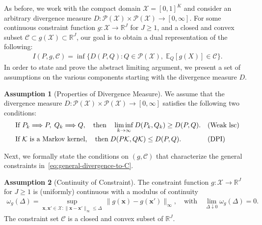 \documentclass{article}
\theoremstyle{plain}
\theoremstyle{definition}
\newtheorem{assumption}[assumption]{Assumption}
\newcommand{\R}{\mathbb{R}}
\newcommand{\calP}{\mathcal P}
\newcommand{\calC}{\mathcal C}
\newcommand{\calX}{\mathcal X}
\newcommand{\calK}{\mathcal{K}}
\newcommand{\xvec}{\mathbf{x}}
\newcommand{\qtext}[1]{\quad \text{#1} \quad}
\newcommand{\lsc}{\text{lsc}\xspace}
\begin{document}
As before, we work with the compact domain $\calX = [0,1]^K$ and consider an arbitrary divergence measure $D:\calP(\calX) \times \calP(\calX) \to [0, \infty]$. For some continuous constraint function $g:\calX \to \R^J$ for $J \geq 1$, and a closed and convex subset $\calC \subset g(\calX) \subset \R^J$, our goal is to obtain a dual representation of the following: 
\begin{align}
    I(P, g, \calC) = \inf\{D(P, Q): Q \in \calP(\calX), \; \mathbb{E}_Q[g(X)] \in \calC \}. \label{eq:general-divergence-to-C}
\end{align}
In order to state and prove the abstract limiting argument, we present a set of assumptions on the various components starting with the divergence measure $D$.
\begin{assumption}[Properties of Divergence Measure]
    \label{assump:general-divergence} We assume that the divergence measure $D:\calP(\calX) \times \calP(\calX) \to [0,\infty]$ satisfies the following two conditions: 
    \begin{align}
        &\text{If } P_k \Longrightarrow P, \; Q_k \Longrightarrow Q, \qtext{then} \liminf_{k \to \infty} D(P_k, Q_k) \geq D(P, Q). && \text{(Weak \lsc)} \\
        &\text{If } \calK \text{ is a Markov kernel}, \quad \text{then} \; D(P\calK, Q\calK) \leq D(P, Q). && \text{(DPI)} 
    \end{align}
\end{assumption}
Next, we formally state the conditions on $(g, \calC)$ that characterize the general constraints in~\eqref{eq:general-divergence-to-C}. 
\begin{assumption}[Continuity of Constraint]
    \label{assump:general-constraint} The constraint function $g:\calX \to \R^J$ for $J \geq 1$ is (uniformly) continuous with a modulus of continuity 
    \begin{align}
        \omega_g(\Delta) = \sup_{\xvec, \xvec' \in \calX: \|\xvec-\xvec'\|_\infty \leq \Delta} \, \|g(\xvec) - g(\xvec')\|_\infty, \qtext{with} \lim_{\Delta \downarrow 0} \omega_g(\Delta) = 0.  
    \end{align}
    The constraint set $\calC$ is a closed and convex subset of $\R^J$. 
\end{assumption}
\end{document}

